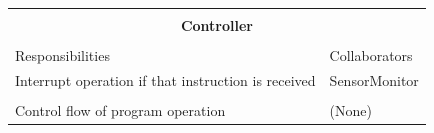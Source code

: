 \documentclass[titlepage]{article}
\begin{document}
\begin{table}[!htbp]
\centering
\begin{tabular}{| p{} | p{} |}\hline
	\multicolumn{2}{|l|}{}\\
	\multicolumn{2}{|c|}{\large{\textbf{Controller}}}\\
	\multicolumn{2}{|l|}{}\\\hline
	\vspace{0mm}\large{Responsibilities}\vspace{2mm} &\vspace{0mm}\large{Collaborators}\vspace{2mm}\\\hline
	\vspace{0mm}Interrupt operation if that instruction is received	&\vspace{0mm}SensorMonitor \\&\\
	Control flow of program operation\vspace{2mm}	&(None)\vspace{2mm}\\\hline
\end{tabular}
\end{table}
\end{document}
